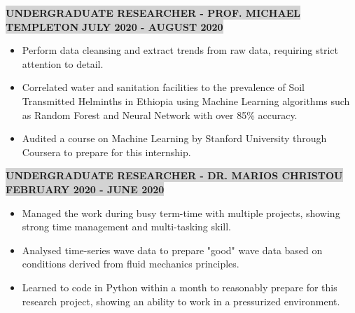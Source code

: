 \documentclass[10pt]{article}
\begin{document}
\begin{center}
{{\colorbox{lightgrey}{\textbf{UNDERGRADUATE RESEARCHER - PROF. MICHAEL TEMPLETON} \quad \qquad \qquad \quad  \quad \quad \quad \quad \quad \quad \qquad \qquad  \quad \textbf{JULY 2020 - AUGUST 2020}}}}
\end{center}
\vspace{-0.6cm}
\begin{itemize}
\setlength\itemsep{0.1em}
    \item Perform data cleansing and extract trends from raw data, requiring strict attention to detail.
    \item Correlated water and sanitation facilities to the prevalence of Soil Transmitted Helminths in Ethiopia using Machine Learning algorithms such as Random Forest and Neural Network with over 85\% accuracy.
    \item Audited a course on Machine Learning by Stanford University through Coursera to prepare for this internship.
\end{itemize}

\begin{center}
{{\colorbox{lightgrey}{\textbf{UNDERGRADUATE RESEARCHER - DR. MARIOS CHRISTOU} \quad \quad \qquad \qquad \quad\quad \quad \quad \quad \quad \qquad \qquad \quad  \quad \textbf{FEBRUARY 2020 - JUNE 2020}}}}
\end{center}
\vspace{-0.6cm}
\begin{itemize}
\setlength\itemsep{0.1em}
    \item Managed the work during busy term-time with multiple projects, showing strong time management and multi-tasking skill.
    \item Analysed time-series wave data to prepare "good" wave data based on conditions derived from fluid mechanics principles.
    \item Learned to code in Python within a month to reasonably prepare for this research project, showing an ability to work in a pressurized environment.
\end{itemize}

\begin{comment}
\begin{center}
{{\fontfamily{lmtt}\colorbox{lightgrey}{\textbf{TEAM MEMBER - GAIL'S BAKERY LONDON } \quad \quad \qquad  \quad \quad \qquad \quad \quad \quad \quad \qquad \qquad \quad \quad  \qquad \quad \quad \qquad\textbf{NOVEMBER 2018 - MARCH 2019}}}}
\end{center}
\begin{itemize}
    \item Provide high-quality hospitality in a high-pressure, high-paced environment.
\end{itemize}
\end{comment}
\end{document}
